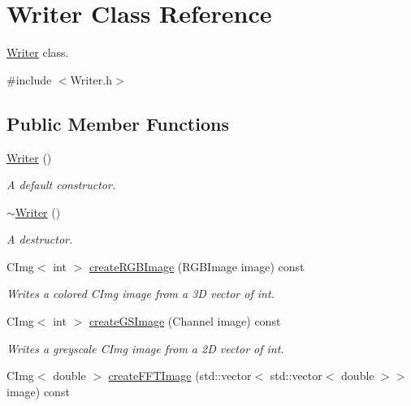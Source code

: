 \hypertarget{class_writer}{}\section{Writer Class Reference}
\label{class_writer}


\hyperlink{class_writer}{Writer} class.  




{\ttfamily \#include $<$Writer.\+h$>$}

\subsection*{Public Member Functions}
\begin{DoxyCompactItemize}
\item 
\mbox{\label{class_writer_aedc04cd5fb7b4b99d3ad906fef2116ce}} 
\hyperlink{class_writer_aedc04cd5fb7b4b99d3ad906fef2116ce}{Writer} ()
\begin{DoxyCompactList}\small\item\em A default constructor. \end{DoxyCompactList}\item 
\mbox{\label{class_writer_a6f57399b94731301d267ce10a2f52ea3}} 
\hyperlink{class_writer_a6f57399b94731301d267ce10a2f52ea3}{$\sim$\+Writer} ()
\begin{DoxyCompactList}\small\item\em A destructor. \end{DoxyCompactList}\item 
C\+Img$<$ int $>$ \hyperlink{class_writer_ad5b28e682415d1e47aa9e5d8e43dc217}{create\+R\+G\+B\+Image} (R\+G\+B\+Image image) const
\begin{DoxyCompactList}\small\item\em Writes a colored C\+Img image from a 3D vector of int. \end{DoxyCompactList}\item 
C\+Img$<$ int $>$ \hyperlink{class_writer_ad6f6af01ef126d3d2b84d2e0e69f3f3e}{create\+G\+S\+Image} (Channel image) const
\begin{DoxyCompactList}\small\item\em Writes a greyscale C\+Img image from a 2D vector of int. \end{DoxyCompactList}\item 
C\+Img$<$ double $>$ \hyperlink{class_writer_af9181de5668ce4180a58093816384f17}{create\+F\+F\+T\+Image} (std\+::vector$<$ std\+::vector$<$ double $>$$>$ image) const
$$
\end{DoxyCompactItemize}

